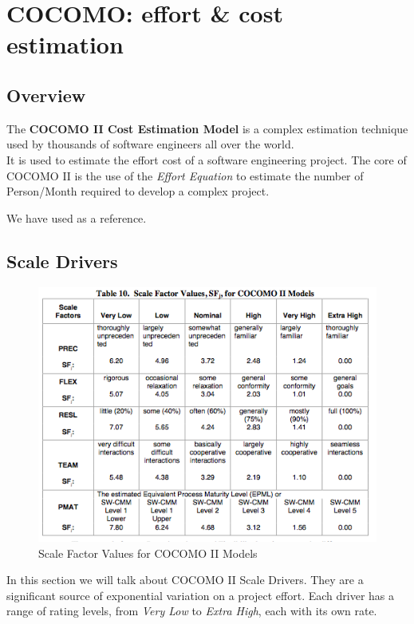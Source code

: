 \section{COCOMO: effort \& cost estimation}
\subsection{Overview} %
\label{sub:cocomo_overview}
The \textbf{COCOMO II Cost Estimation Model} is a complex estimation technique used 
by thousands of software engineers all over the world. \\
It is used to estimate the effort cost of a software engineering project.
The core of COCOMO II is the use of the \emph{Effort Equation} to estimate the number
of Person/Month required to develop a complex project.

We have used \cite{bib:cocomo} as a reference.

\subsection{Scale Drivers} %
\label{sub:scale_drivers}
\begin{figure}[h]
    \includegraphics[trim={0.23cm 0.2cm 0.43cm 0.55cm},clip,width=\linewidth]{img/scaledriver.png}
    \caption{Scale Factor Values for COCOMO II Models}
    \label{tbl:scale}
\end{figure}

\pagebreak 
In this section we will talk about COCOMO II Scale Drivers. They are a significant
source of exponential variation on a project effort. Each driver has a range of 
rating levels, from \emph{Very Low} to \emph{Extra High}, each with its own rate. 


